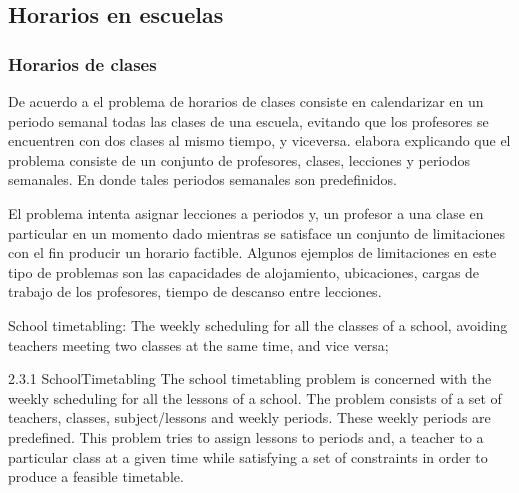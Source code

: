 \documentclass[draft,12pt,headsepline,footsepline,paper=letter]{scrreprt}
\begin{document}

\subsection{Horarios en escuelas}


\subsubsection{Horarios de clases}

De acuerdo a \citet[p.~88]{schaerf99a-survey-of-automated} el problema de horarios de clases consiste en calendarizar en un periodo semanal todas las clases de una escuela, evitando que los profesores se encuentren con dos clases al mismo tiempo, y viceversa. \citet[p.~10,11]{abdullah06heuristic-approaches} elabora explicando que el problema consiste de un conjunto de profesores, clases, lecciones y periodos semanales. En donde tales periodos semanales son predefinidos.

El problema intenta asignar lecciones a periodos y, un profesor a una clase en particular en un momento dado mientras se satisface un conjunto de limitaciones con el fin producir un horario factible. Algunos ejemplos de limitaciones en este tipo de problemas son las capacidades de alojamiento, ubicaciones, cargas de trabajo de los profesores, tiempo de descanso entre lecciones.

\iffalse
School timetabling: The weekly scheduling for all the classes of a school, avoiding teachers meeting two classes at the same time, and vice versa;

2.3.1 SchoolTimetabling
The school timetabling problem is concerned with the weekly scheduling for all the lessons of a school. The problem consists of a set of teachers, classes, subject/lessons and weekly periods. These weekly periods are predefined. This problem tries to assign lessons to periods and, a teacher to a particular class at a given time while satisfying a set of constraints in order to produce a feasible timetable.
\end{document}
